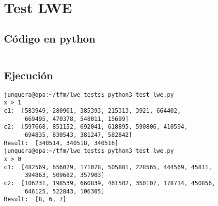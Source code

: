 \chapter{Test LWE}
\label{appendix:test_lwe}

\section{Código en python}

\inputminted{python}{apendices/test_lwe.py}

\section{Ejecución}

\begin{verbatim}
junquera@opa:~/tfm/lwe_tests$ python3 test_lwe.py
x > 1
c1:  [583949, 280901, 385393, 215313, 3921, 664402,
      669495, 470378, 548011, 15699]
c2:  [597668, 851152, 692041, 618895, 590806, 410594,
      694835, 830543, 381247, 582842]
Result:  [340514, 340518, 340516]
junquera@opa:~/tfm/lwe_tests$ python3 test_lwe.py
x > 0
c1:  [482569, 656029, 171078, 505801, 228565, 444569, 45811,
      394863, 509682, 357903]
c2:  [106231, 198539, 660839, 461502, 350107, 178714, 450856,
      646125, 522843, 106305]
Result:  [8, 6, 7]
\end{verbatim}
